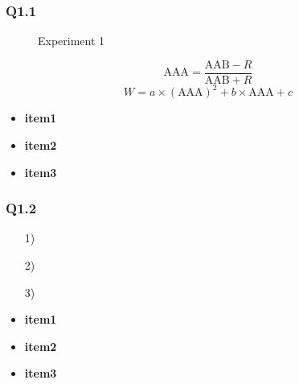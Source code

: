\documentclass{mcmthesis}
\begin{document}
\subsubsection{Q1.1}
\lipsum[9]
\begin{figure}[htp] 
  \caption{Experiment 1}
  \end{figure} 
\lipsum[10]
\begin{equation}
  \text{AAA}=\frac{\text{AAB}-R}{\text{AAB}+R}
\end{equation}  
\indent \lipsum[11]
\begin{equation}
  W = a \times (\text{AAA})^{2}+b \times {\text{AAA}}+c 
\end{equation}
\indent \lipsum[12]
\renewcommand\labelitemi{\Large$\bullet$}
\begin{itemize}[itemsep= 0 pt,topsep = 2 pt]
\item \textbf{item1}\\
\lipsum[13]
\item \textbf{item2} \\
\lipsum[14]
\item \textbf{item3}\\
\lipsum[15]
\end{itemize}
\par \lipsum[16-18]

\subsubsection{Q1.2}

\vspace{0em}
\begin{itemize}
  \setlength{\itemsep}{1pt}
  \setlength{\itemsep}{0pt}
  \setlength{\itemsep}{0pt}
  \item [1)]

  \item [2)]
  
  \item [3)]
 
\end{itemize}
\vspace{-1em}
\par \lipsum[19]
\renewcommand\labelitemi{\Large$\bullet$}
\begin{itemize}[itemsep= 0 pt,topsep = 2 pt]
\item \textbf{item1} \\

\item \textbf{item2} \\

\item \textbf{item3} \\

\end{itemize}
\end{document}
